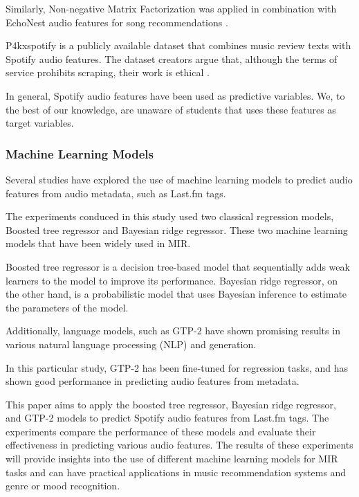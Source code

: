 \documentclass[sn-mathphys]{sn-jnl}%
\theoremstyle{thmstyleone}%
\theoremstyle{thmstyletwo}%
\theoremstyle{thmstylethree}%
\begin{document}
Similarly, Non-negative Matrix Factorization was applied in combination with EchoNest audio features
for song recommendations \cite{benzi2016song}.

P4kxspotify is a publicly available dataset that combines music review texts with Spotify audio features.
The dataset creators argue that, although the terms of service prohibits scraping, their work is ethical \cite{pinter2020p4kxspotify}.

In general, Spotify audio features have been used as predictive variables.
We, to the best of our knowledge, are unaware of students that uses these features as target variables.

\subsubsection{Machine Learning Models}

Several studies have explored the use of machine learning
models to predict audio features from audio metadata, such as Last.fm tags.

The experiments conduced in this study used two classical regression models,
Boosted tree regressor and Bayesian ridge regressor.
These two machine learning models that have been widely used in MIR. %

Boosted tree regressor is a decision tree-based model that sequentially
adds weak learners to the model to improve its performance.
Bayesian ridge regressor, on the other hand,
is a probabilistic model that uses Bayesian inference to estimate
the parameters of the model.

Additionally, language models, such as GTP-2 have shown promising results in various
natural language processing (NLP) and generation.

In this particular study, GTP-2 has been fine-tuned for regression tasks,
and has shown good performance in predicting audio features from metadata.

This paper aims to apply the boosted tree regressor,
 Bayesian ridge regressor, and GTP-2 models to predict Spotify audio features from Last.fm tags.
The experiments compare the performance of these models and evaluate their effectiveness
in predicting various audio features.
The results of these experiments will provide insights into
the use of different machine learning models for MIR tasks
and can have practical applications
in music recommendation systems and genre or mood recognition.
\end{document}
